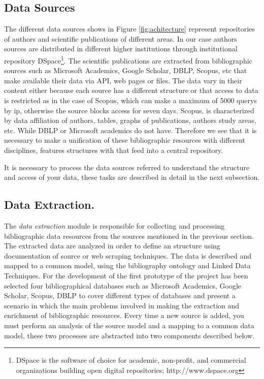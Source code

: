 \documentclass[11pt]{article}
\begin{document}
\subsection{Data Sources}
The different data sources shows in Figure \ref{fig:achitecture}  represent repositories of authors and scientific publications of different areas. In our case authors sources are distributed in different higher institutions through institutional repository DSpace\footnote{DSpace is the software of choice for academic, non-profit, and commercial organizations building open digital repositories; http://www.dspace.org}. The scientific publications  are extracted from bibliographic sources such as Microsoft Academics, Google Scholar, DBLP, Scopus, etc that make available their data via API, web pages or files. The data vary in their content either because each source has a different structure or that access to data is restricted as in the case of Scopus, which can make a maximum of 5000 querys  by ip, otherwise the source blocks access for seven days. Scopus, is characterized by data affiliation of authors, tables, graphs of publications, authors study areas, etc. While DBLP or Microsoft academics do not have. Therefore we see  that it is necessary to make a unification of these bibliographic resources with different disciplines, features structures with that feed into a central repository.

It is necessary to process the data sources referred to understand the structure and  access  of your data, these tasks are described in detail in the next subsection.



\subsection{Data Extraction.}


The \emph{data extraction} module is responsible for collecting and processing bibliographic data resources from the sources mentioned in the previous section.
The extracted data are analyzed in order to define an structure using documentation of source or web scraping techniques. The data is described and mapped to a common model, using the bibliography ontology  and Linked Data Techniques. For the development of the first prototype of the project has been selected four bibliographical databases such as Microsoft Academics, Google Scholar, Scopus, DBLP  to cover different types of databases and present a scenario in which the main problems involved in making the extraction and enrichment of bibliographic resources. Every time a new source is added, you must perform an analysis of the source model and a mapping to a common data model, these two processes are abstracted into two components described below.
\end{document}
